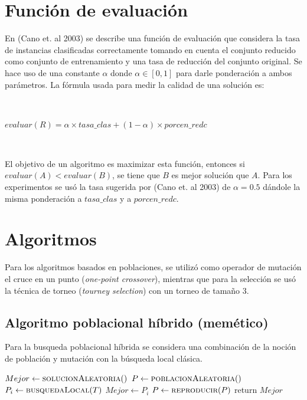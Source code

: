 \documentclass[11pt]{article}
\begin{document}
\section{Función de evaluación}
En (Cano et. al 2003) se describe una función de evaluación que considera la tasa de instancias clasificadas correctamente tomando en cuenta el conjunto reducido como conjunto de entrenamiento y una tasa de reducción del conjunto original. Se hace uso de una constante $\alpha$ donde $\alpha \in [0,1]$ para darle ponderación a ambos parámetros. La fórmula usada para medir la calidad de una solución es:

~\

\begin{center}
    {\fontsize{10}{10}\selectfont
    $ evaluar(R) = \alpha \times tasa\_clas + (1 - \alpha) \times porcen\_redc $
    }
\end{center}

~\

El objetivo de un algoritmo es maximizar esta función, entonces si $evaluar(A) < evaluar(B)$, se tiene que $B$ es mejor solución que $A$. Para los experimentos se usó la tasa sugerida por (Cano et. al 2003) de $\alpha = 0.5$ dándole la misma ponderación a $tasa\_clas$ y a $porcen\_redc$.

\section{Algoritmos}

    Para los algoritmos basados en poblaciones, se utilizó como operador de mutación el cruce en un punto (\emph{one-point crossover}), mientras que para la selección se usó la técnica de torneo (\emph{tourney selection}) con un torneo de tamaño 3.

    \subsection{Algoritmo poblacional híbrido (memético)}
    Para la busqueda poblacional híbrida se considera una combinación de la noción de población y mutación con la búsqueda local clásica.

    {\fontsize{9}{12}\selectfont
    \begin{algorithmic}
            \State $Mejor \gets \Call{solucionAleatoria}$
            \State $P \gets \Call{poblacionAleatoria}$
                  \State $P_i \gets \Call{busquedaLocal}{T}$
                        \State $Mejor \gets P_i$
                    \EndIf
                \EndFor
            \State $P \gets \Call{reproducir}{P}$
            \EndWhile
            \State return $Mejor$
        \EndFunction
    \end{algorithmic}
    }
\end{document}
